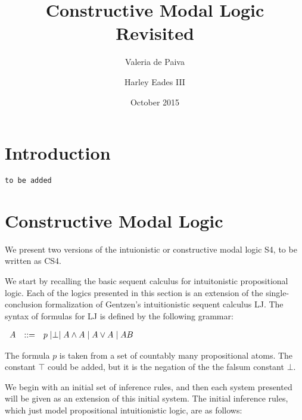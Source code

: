 \documentclass{article}
\title{Constructive Modal Logic Revisited}
\author{Valeria de Paiva \and Harley Eades III}
\date{October 2015}
\let\to\relax
\newcommand{\to}{\rightarrow}
\begin{document}
\maketitle

\section{Introduction}
{\tt to be added}

\section{Constructive Modal Logic}

We present two versions of  the intuionistic or constructive modal logic S4, to be written as CS4. 

We start by recalling the basic sequent calculus for intuitonistic propositional logic. Each of the logics presented in this section is an extension of the
single-conclusion formalization of Gentzen's intuitionistic sequent
calculus LJ.  The syntax of formulas for LJ is defined by the
following grammar:
\begin{center}
    \begin{math}
        \begin{array}{lllllllll}
            A & ::= & p \mid \perp \mid A \land A \mid A \lor A \mid A \to B
        \end{array}
    \end{math}
\end{center}
The formula $p$ is taken from a set of countably many propositional atoms. The constant $\top$ could be added, but it is the negation of the the falsum constant $\bot$.

We begin with an initial set of inference rules, and then each system
presented will be given as an extension of this initial system.  The  initial inference rules, which just model
propositional intuitionistic logic, are as follows:
\end{document}
